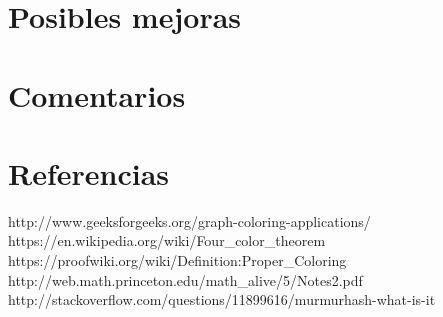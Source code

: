 \documentclass[11pt,a4paper]{article}
\theoremstyle{plain}
\begin{document}
\section{Posibles mejoras}

\section{Comentarios}

\newpage
\section{Referencias}
\begin{thebibliography}{9}
	http://www.geeksforgeeks.org/graph-coloring-applications/
	https://en.wikipedia.org/wiki/Four\_color\_theorem
	https://proofwiki.org/wiki/Definition:Proper\_Coloring
 	http://web.math.princeton.edu/math\_alive/5/Notes2.pdf
 	http://stackoverflow.com/questions/11899616/murmurhash-what-is-it

\end{thebibliography}
\end{document}
